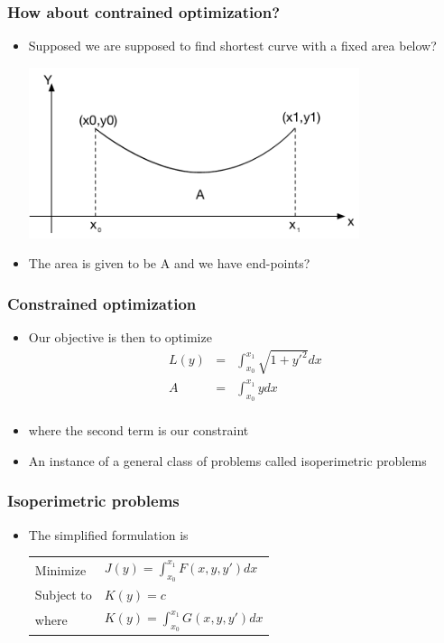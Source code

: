 \documentclass[10pt]{beamer}
\begin{document}
\begin{frame}
  \frametitle{How about contrained optimization?}
  \begin{itemize}
  \item Supposed we are supposed to find shortest curve with a fixed area below?
    \centerline{\includegraphics[height=5cm]{constrained}}
  \item The area is given to be A and we have end-points? 
  \end{itemize}
\end{frame}

\begin{frame}
  \frametitle{Constrained optimization}
  \begin{itemize}
  \item Our objective is then to optimize
    \[
      \begin{array}{rcl}
        L(y) &=& \int_{x_0}^{x_1} \sqrt{ 1 + y'^2} dx\\[3mm]
        A    &=& \int_{x_0}^{x_1} y dx\\
      \end{array}
    \]
  \item where the second term is our constraint
  \item An instance of a general class of problems called isoperimetric problems
  \end{itemize}
\end{frame}

\begin{frame}
  \frametitle{Isoperimetric problems}
  \begin{itemize}
  \item The simplified formulation is\\
    
    \begin{tabular}{ll}
      Minimize & $J(y) = \int_{x_0}^{x_1} F(x,y,y') dx$\\
      Subject to & $K(y) = c$ \\
      where & $K(y) = \int_{x_0}^{x_1} G(x, y,y') dx$
    \end{tabular}
  \end{itemize}
\end{frame}
\end{document}
